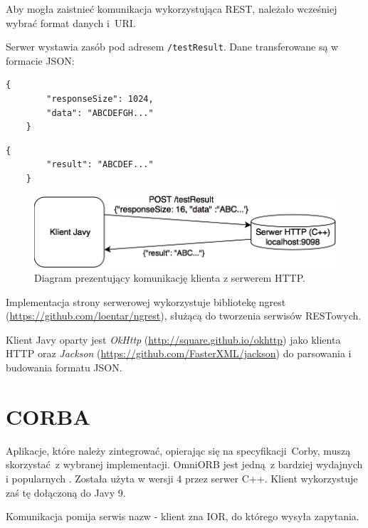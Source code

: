 \label{REST_impl}
Aby mogła zaistnieć komunikacja wykorzystująca REST, należało wcześniej wybrać format danych i~URI.

Serwer wystawia zasób pod adresem \texttt{/testResult}. Dane transferowane są w formacie JSON:
\begin{lstlisting}[caption={Format danych wysyłany przez klienta.},captionpos=b]
    {
        "responseSize": 1024,
        "data": "ABCDEFGH..."
    }
\end{lstlisting}

\begin{lstlisting}[caption={Format danych zwracany przez serwer.},captionpos=b]
    {
        "result": "ABCDEF..."
    }
\end{lstlisting}

\begin{figure}[h!]
    \centering
    \includegraphics[width=\textwidth,height=\textheight,keepaspectratio]{img/rest_impl_diagram.png}
    \caption{Diagram prezentujący komunikację klienta z serwerem HTTP.}
\end{figure}

Implementacja strony serwerowej wykorzystuje bibliotekę ngrest (\url{https://github.com/loentar/ngrest}), służącą do tworzenia serwisów RESTowych.

Klient Javy oparty jest \textit{OkHttp} (\url{http://square.github.io/okhttp}) jako klienta HTTP oraz \textit{Jackson} \newline (\url{https://github.com/FasterXML/jackson}) do parsowania i budowania formatu JSON.


\section{CORBA}

Aplikacje, które należy zintegrować, opierając się na specyfikacji Corby, muszą skorzystać z wybranej implementacji. OmniORB jest jedną z bardziej wydajnych i popularnych \cite{omniORB}. Została użyta w wersji 4 przez serwer C++. Klient wykorzystuje zaś tę dołączoną do Javy 9.

Komunikacja pomija serwis nazw - klient zna IOR, do którego wysyła zapytania.

